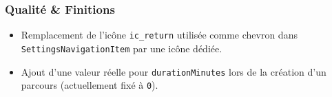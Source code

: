\documentclass[a4paper, 12pt]{article}
\begin{document}
\begin{justify}
\subsubsection*{Qualité \& Finitions}

\begin{itemize}
    \item Remplacement de l'icône \texttt{ic\_return} utilisée comme chevron dans \texttt{SettingsNavigationItem} par une icône dédiée.
    \item Ajout d'une valeur réelle pour \texttt{durationMinutes} lors de la création d'un parcours (actuellement fixé à \texttt{0}).
\end{itemize}



\end{justify}
\end{document}
